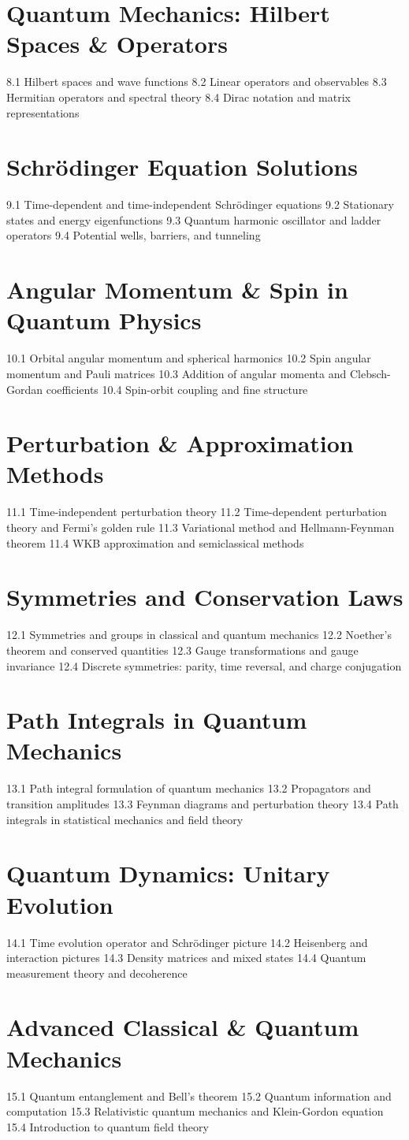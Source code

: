 \section{Quantum Mechanics: Hilbert Spaces \& Operators}
8.1 Hilbert spaces and wave functions
8.2 Linear operators and observables
8.3 Hermitian operators and spectral theory
8.4 Dirac notation and matrix representations
\section{Schrödinger Equation Solutions}
9.1 Time-dependent and time-independent Schrödinger equations
9.2 Stationary states and energy eigenfunctions
9.3 Quantum harmonic oscillator and ladder operators
9.4 Potential wells, barriers, and tunneling
\section{Angular Momentum \& Spin in Quantum Physics}
10.1 Orbital angular momentum and spherical harmonics
10.2 Spin angular momentum and Pauli matrices
10.3 Addition of angular momenta and Clebsch-Gordan coefficients
10.4 Spin-orbit coupling and fine structure
\section{Perturbation \& Approximation Methods}
11.1 Time-independent perturbation theory
11.2 Time-dependent perturbation theory and Fermi's golden rule
11.3 Variational method and Hellmann-Feynman theorem
11.4 WKB approximation and semiclassical methods
\section{Symmetries and Conservation Laws}
12.1 Symmetries and groups in classical and quantum mechanics
12.2 Noether's theorem and conserved quantities
12.3 Gauge transformations and gauge invariance
12.4 Discrete symmetries: parity, time reversal, and charge conjugation
\section{Path Integrals in Quantum Mechanics}
13.1 Path integral formulation of quantum mechanics
13.2 Propagators and transition amplitudes
13.3 Feynman diagrams and perturbation theory
13.4 Path integrals in statistical mechanics and field theory
\section{Quantum Dynamics: Unitary Evolution}
14.1 Time evolution operator and Schrödinger picture
14.2 Heisenberg and interaction pictures
14.3 Density matrices and mixed states
14.4 Quantum measurement theory and decoherence
\section{Advanced Classical \& Quantum Mechanics}
15.1 Quantum entanglement and Bell's theorem
15.2 Quantum information and computation
15.3 Relativistic quantum mechanics and Klein-Gordon equation
15.4 Introduction to quantum field theory
